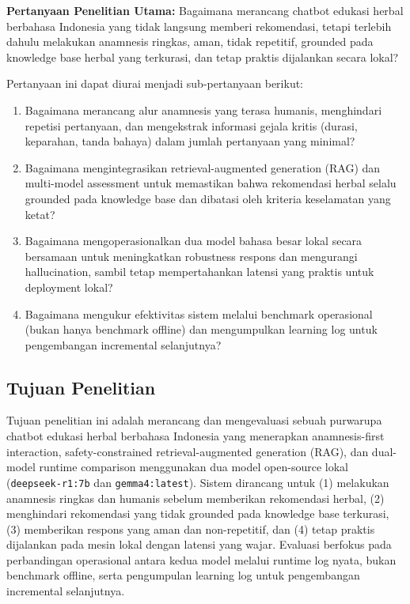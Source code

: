 \documentclass[conference]{IEEEtran}
\begin{document}
\textbf{Pertanyaan Penelitian Utama:} Bagaimana merancang chatbot edukasi herbal berbahasa Indonesia yang tidak langsung memberi rekomendasi, tetapi terlebih dahulu melakukan anamnesis ringkas, aman, tidak repetitif, grounded pada knowledge base herbal yang terkurasi, dan tetap praktis dijalankan secara lokal?

Pertanyaan ini dapat diurai menjadi sub-pertanyaan berikut:
\begin{enumerate}
\item Bagaimana merancang alur anamnesis yang terasa humanis, menghindari repetisi pertanyaan, dan mengekstrak informasi gejala kritis (durasi, keparahan, tanda bahaya) dalam jumlah pertanyaan yang minimal?
\item Bagaimana mengintegrasikan retrieval-augmented generation (RAG) dan multi-model assessment untuk memastikan bahwa rekomendasi herbal selalu grounded pada knowledge base dan dibatasi oleh kriteria keselamatan yang ketat?
\item Bagaimana mengoperasionalkan dua model bahasa besar lokal secara bersamaan untuk meningkatkan robustness respons dan mengurangi hallucination, sambil tetap mempertahankan latensi yang praktis untuk deployment lokal?
\item Bagaimana mengukur efektivitas sistem melalui benchmark operasional (bukan hanya benchmark offline) dan mengumpulkan learning log untuk pengembangan incremental selanjutnya?
\end{enumerate}

\subsection{Tujuan Penelitian}
Tujuan penelitian ini adalah merancang dan mengevaluasi sebuah purwarupa chatbot edukasi herbal berbahasa Indonesia yang menerapkan anamnesis-first interaction, safety-constrained retrieval-augmented generation (RAG), dan dual-model runtime comparison menggunakan dua model open-source lokal (\texttt{deepseek-r1:7b} dan \texttt{gemma4:latest}). Sistem dirancang untuk (1) melakukan anamnesis ringkas dan humanis sebelum memberikan rekomendasi herbal, (2) menghindari rekomendasi yang tidak grounded pada knowledge base terkurasi, (3) memberikan respons yang aman dan non-repetitif, dan (4) tetap praktis dijalankan pada mesin lokal dengan latensi yang wajar. Evaluasi berfokus pada perbandingan operasional antara kedua model melalui runtime log nyata, bukan benchmark offline, serta pengumpulan learning log untuk pengembangan incremental selanjutnya.
\end{document}
